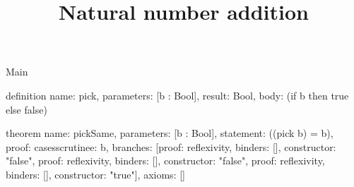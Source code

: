 \begin{lexlean}{Main}
\title{Natural number addition}
\begin{semanticmodule}
definition{
  name: pick,
  parameters: [b : Bool],
  result: Bool,
  body: (if b then true else false)
}

theorem{
  name: pickSame,
  parameters: [b : Bool],
  statement: ((pick b) = b),
  proof: cases{scrutinee: b, branches: [{proof: reflexivity{}, binders: [], constructor: "false"}, {proof: reflexivity{}, binders: [], constructor: "false"}, {proof: reflexivity{}, binders: [], constructor: "true"}]},
  axioms: []
}
\end{semanticmodule}
\end{lexlean}
